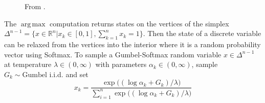 \documentclass[11pt,a4paper]{article}
\DeclareMathOperator*{\argmax}{arg\,max}
\begin{document}
\begin{figure}[htbp]
\centering
{}\hfill
{}
    \caption{From \citet{maddison2016concrete}.}
\end{figure}

The $\argmax$ computation returns states on the vertices of the simplex $\Delta^{n-1} = \{ x \in \mathbb{R}^n | x_k \in [0, 1],\sum_{k=1}^{n} x_k = 1 \} $. Then the state of a discrete variable can be relaxed from the vertices into the interior where it is a random probability vector using Softmax. To sample a Gumbel-Softmax random variable $x \in \Delta^{n-1}$ at temperature $\lambda \in (0,\infty)$ with parameters $\alpha_k \in (0,\infty)$, sample $G_k \sim \text{Gumbel}$ i.i.d. and set
\begin{equation}
\label{Gumbel-Softmax}
    x_k = \frac{\exp{((\log \alpha_k + G_k) / \lambda})}{\sum_{i=1}^{n} \exp{((\log \alpha_k + G_k) / \lambda})}
\end{equation}
\end{document}

